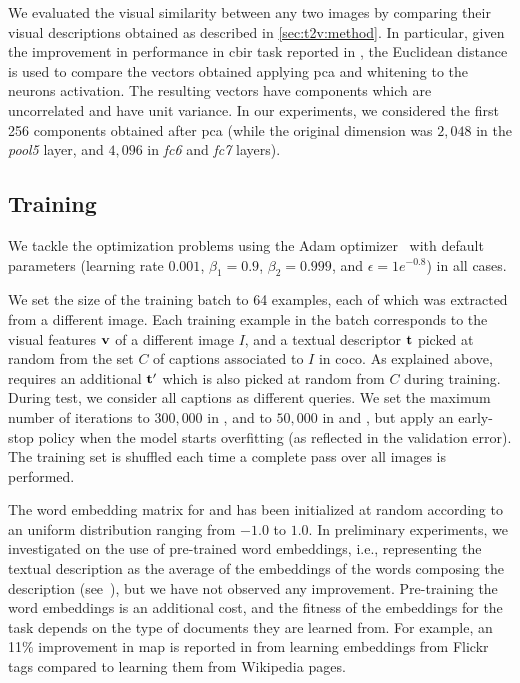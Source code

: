 We evaluated the visual similarity between any two images by comparing their visual descriptions obtained as described in \ref{sec:t2v:method}.
In particular, given the improvement in performance in \gls{cbir} task reported in \cite{sharif2014cnn,gong2014multi,gordo2016deep}, the Euclidean distance is used to compare the vectors obtained applying \gls{pca} and whitening \cite{comon1994independent} to the neurons activation.
The resulting vectors have components which are uncorrelated and have unit variance.
In our experiments, we considered the first 256 components obtained after \gls{pca} (while the original dimension was $2,048$ in the \emph{pool5} layer, and $4,096$ in \emph{fc6} and \emph{fc7} layers).


\subsection{Training}

We tackle the optimization problems using the Adam optimizer~\cite{kingma2014adam} with default parameters (learning rate $0.001$, $\beta_1=0.9$, $\beta_2=0.999$, and $\epsilon=1e^{-0.8}$) in all cases.

We set the size of the training batch to 64 examples, each of which was extracted from a different image.
Each training example in the batch corresponds to the visual features $\mathbf{v}$ of a different image $I$, and a textual descriptor $\mathbf{t}$ picked at random from the set $C$ of captions associated to $I$ in \gls{coco}.
As explained above, \sparsettv{} requires an additional $\mathbf{t}'$ which is also picked at random from $C$ during training.
During test, we consider all captions as different queries.
We set the maximum number of iterations to $300,000$ in \sparsettv{}, and to $50,000$ in \densettv{} and \widedeepttv{}, but apply an early-stop policy when the model starts overfitting (as reflected in the validation error).
The training set is shuffled each time a complete pass over all images is performed.

The word embedding matrix for \densettv{} and \widedeepttv{} has been initialized at random according to an uniform distribution ranging from $-1.0$ to $1.0$.
In preliminary experiments, we investigated on the use of pre-trained word embeddings, i.e.,  representing the textual description as the average of the embeddings of the words composing the description (see~\cite{dong2018predicting}), but we have not observed any improvement.
Pre-training the word embeddings is an additional cost, and the fitness of the embeddings for the task depends on the type of documents they are learned from.
For example, an 11\% improvement in \gls{map} is reported in \cite{cappallo2015image2emoji} from learning embeddings from Flickr tags compared to learning them from Wikipedia pages.

